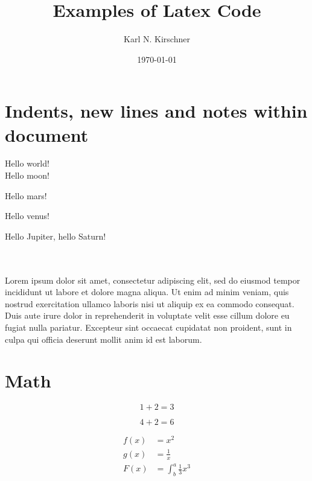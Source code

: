 \documentclass{article}
\title{Examples of Latex Code}
\author{Karl N. Kirschner}
\date{\today}
\begin{document}
\maketitle

\section{Indents, new lines and notes within document}

Hello world! \\
Hello moon!

Hello mars!

\noindent
Hello venus!

Hello Jupiter,
hello Saturn!

~\\
~\\

Lorem ipsum dolor sit amet, consectetur adipiscing elit, sed do eiusmod tempor incididunt ut labore et dolore magna aliqua. Ut enim ad minim veniam, quis nostrud exercitation ullamco laboris nisi ut aliquip ex ea commodo consequat. Duis aute irure dolor in reprehenderit in voluptate velit esse cillum dolore eu fugiat nulla pariatur.
Excepteur sint occaecat cupidatat non proident, sunt in culpa qui officia deserunt mollit anim id est laborum.

\section{Math}

\begin{equation}
  1 + 2 = 3
\end{equation}

\begin{equation*}
  4 + 2 = 6
\end{equation*}

\begin{align}
  f(x) &= x^2\\
  g(x) &= \frac{1}{x}\\
  F(x) &= \int^a_b \frac{1}{3}x^3
\end{align}
\end{document}
